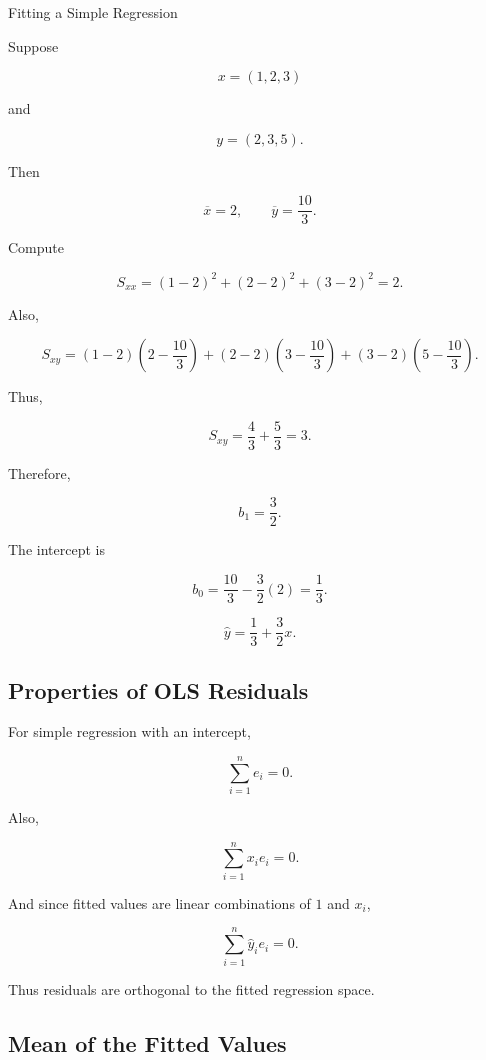 \begin{workedexamplebox}{Fitting a Simple Regression}

Suppose

\[
x=(1,2,3)
\]

and

\[
y=(2,3,5).
\]

Then

\[
\overline{x}=2,
\qquad
\overline{y}=\frac{10}{3}.
\]

Compute

\[
S_{xx}
=
(1-2)^2
+
(2-2)^2
+
(3-2)^2
=
2.
\]

Also,

\[
S_{xy}
=
(1-2)
\left(
2-\frac{10}{3}
\right)
+
(2-2)
\left(
3-\frac{10}{3}
\right)
+
(3-2)
\left(
5-\frac{10}{3}
\right).
\]

Thus,

\[
S_{xy}
=
\frac43+\frac53
=
3.
\]

Therefore,

\[
b_1
=
\frac32.
\]

The intercept is

\[
b_0
=
\frac{10}{3}
-
\frac32(2)
=
\frac13.
\]

\begin{answerbox}
\[
\boxed{
\widehat{y}
=
\frac13
+
\frac32x.
}
\]
\end{answerbox}

\end{workedexamplebox}

\subsection{Properties of OLS Residuals}
\label{subsec:ols-residual-properties}

For simple regression with an intercept,

\[
\boxed{
\sum_{i=1}^{n}e_i=0.
}
\]

Also,

\[
\boxed{
\sum_{i=1}^{n}x_ie_i=0.
}
\]

And since fitted values are linear combinations of \(1\) and \(x_i\),

\[
\boxed{
\sum_{i=1}^{n}\widehat{y}_ie_i=0.
}
\]

Thus residuals are orthogonal to the fitted regression space.

\subsection{Mean of the Fitted Values}
\label{subsec:mean-fitted-values}

